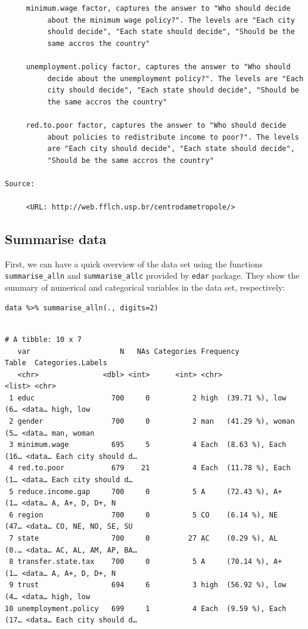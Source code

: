 \documentclass[a4paper]{article}
\begin{document}
\begin{lstlisting}
     minimum.wage factor, captures the answer to "Who should decide
          about the minimum wage policy?". The levels are "Each city
          should decide", "Each state should decide", "Should be the
          same accros the country"

     unemployment.policy factor, captures the answer to "Who should
          decide about the unemployment policy?". The levels are "Each
          city should decide", "Each state should decide", "Should be
          the same accros the country"

     red.to.poor factor, captures the answer to "Who should decide
          about policies to redistribute income to poor?". The levels
          are "Each city should decide", "Each state should decide",
          "Should be the same accros the country"

Source:

     <URL: http://web.fflch.usp.br/centrodametropole/>
\end{lstlisting}


\subsection{Summarise data}
\label{sec:org4e4a737}
First, we can have a quick overview of the data set using the functions \texttt{summarise\_alln} and \texttt{summarise\_allc} provided by \texttt{edar} package. They show the summary of numerical and categorical variables in the data set, respectively:

\lstset{numbers=left,language=r,label= ,caption= ,captionpos=b}
\begin{lstlisting}
data %>% summarise_alln(., digits=2)
    
\end{lstlisting}

\begin{verbatim}
# A tibble: 10 x 7
   var                     N   NAs Categories Frequency                  Table  Categories.Labels  
   <chr>               <dbl> <int>      <int> <chr>                      <list> <chr>              
 1 educ                  700     0          2 high  (39.71 %), low   (6… <data… high, low          
 2 gender                700     0          2 man   (41.29 %), woman (5… <data… man, woman         
 3 minimum.wage          695     5          4 Each  (8.63 %), Each  (16… <data… Each city should d…
 4 red.to.poor           679    21          4 Each  (11.78 %), Each  (1… <data… Each city should d…
 5 reduce.income.gap     700     0          5 A     (72.43 %), A+    (1… <data… A, A+, D, D+, N    
 6 region                700     0          5 CO    (6.14 %), NE    (47… <data… CO, NE, NO, SE, SU 
 7 state                 700     0         27 AC    (0.29 %), AL    (0.… <data… AC, AL, AM, AP, BA…
 8 transfer.state.tax    700     0          5 A     (70.14 %), A+    (1… <data… A, A+, D, D+, N    
 9 trust                 694     6          3 high  (56.92 %), low   (4… <data… high, low          
10 unemployment.policy   699     1          4 Each  (9.59 %), Each  (17… <data… Each city should d…
\end{verbatim}
\end{document}
